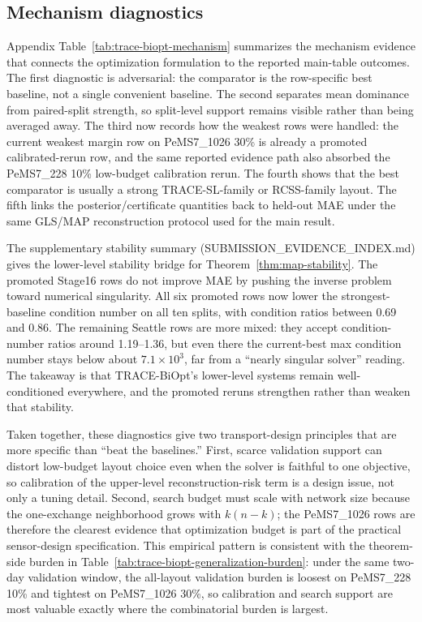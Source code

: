 \subsection{Mechanism diagnostics}

Appendix Table~\ref{tab:trace-biopt-mechanism} summarizes the mechanism evidence that
connects the optimization formulation to the reported main-table outcomes. The first
diagnostic is adversarial: the comparator is the row-specific best baseline,
not a single convenient baseline. The second separates mean dominance from
paired-split strength, so split-level support remains visible rather than being
averaged away. The third now records how the weakest rows were handled: the
current weakest margin row on PeMS7\_1026 30\% is already a promoted
calibrated-rerun row, and the same reported evidence path also absorbed the
PeMS7\_228 10\% low-budget calibration rerun. The fourth shows that the best comparator is
usually a strong TRACE-SL-family or RCSS-family layout. The fifth
links the posterior/certificate quantities back to held-out MAE under the same
GLS/MAP reconstruction protocol used for the main result.

The supplementary stability summary (SUBMISSION\_EVIDENCE\_INDEX.md) gives
the lower-level stability bridge for Theorem~\ref{thm:map-stability}. The
promoted Stage16 rows do not improve MAE by pushing the inverse problem toward
numerical singularity. All six promoted rows now lower the strongest-baseline
condition number on all ten splits, with condition ratios between 0.69 and
0.86. The remaining Seattle rows are more mixed: they accept condition-number
ratios around 1.19--1.36, but even there the current-best max condition number
stays below about $7.1\times 10^3$, far from a ``nearly singular solver''
reading. The takeaway is that TRACE-BiOpt's lower-level systems remain
well-conditioned everywhere, and the promoted reruns strengthen rather than
weaken that stability.

Taken together, these diagnostics give two transport-design principles that are
more specific than ``beat the baselines.'' First, scarce validation support can
distort low-budget layout choice even when the solver is faithful to one
objective, so calibration of the upper-level reconstruction-risk term is a
design issue, not only a tuning detail. Second, search budget must scale with
network size because the one-exchange neighborhood grows with $k(n-k)$; the
PeMS7\_1026 rows are therefore the clearest evidence that optimization budget
is part of the practical sensor-design specification. This empirical pattern is
consistent with the theorem-side burden in
Table~\ref{tab:trace-biopt-generalization-burden}: under the same two-day
validation window, the all-layout validation burden is loosest on
PeMS7\_228 10\% and tightest on PeMS7\_1026 30\%, so calibration and search
support are most valuable exactly where the combinatorial burden is largest.

